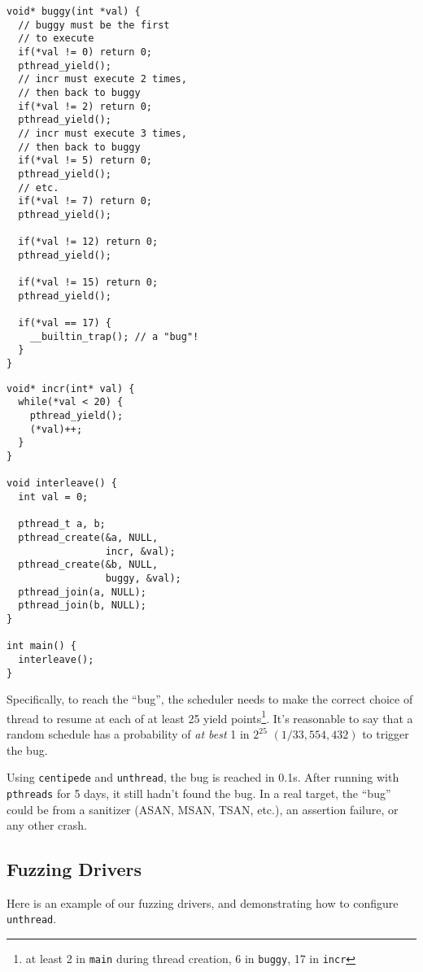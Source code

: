 \documentclass{article}
\begin{document}
\begin{multicols}{2}
\begin{verbatim}
void* buggy(int *val) {
  // buggy must be the first 
  // to execute
  if(*val != 0) return 0; 
  pthread_yield();
  // incr must execute 2 times,
  // then back to buggy
  if(*val != 2) return 0; 
  pthread_yield();
  // incr must execute 3 times, 
  // then back to buggy
  if(*val != 5) return 0;
  pthread_yield();
  // etc.
  if(*val != 7) return 0;
  pthread_yield();

  if(*val != 12) return 0;
  pthread_yield();

  if(*val != 15) return 0;
  pthread_yield();

  if(*val == 17) {
    __builtin_trap(); // a "bug"!
  }
}
\end{verbatim}
\columnbreak
\begin{verbatim}
void* incr(int* val) {
  while(*val < 20) {
    pthread_yield();
    (*val)++;
  }
}

void interleave() {
  int val = 0;
  
  pthread_t a, b;
  pthread_create(&a, NULL, 
                 incr, &val);
  pthread_create(&b, NULL, 
                 buggy, &val);
  pthread_join(a, NULL);
  pthread_join(b, NULL);
}

int main() {
  interleave();
}
\end{verbatim}
\end{multicols}

Specifically, to reach the ``bug'', the scheduler needs to make the correct choice of thread to resume at each of at least 25 yield points\footnote{at least 2 in \texttt{main} during thread creation, 6 in \texttt{buggy}, 17 in \texttt{incr}}. It's reasonable to say that a random schedule has a probability of \textit{at best} 1 in $2^{25}$ $(1/33,554,432)$ to trigger the bug.

Using \texttt{centipede} and \texttt{unthread}, the bug is reached in 0.1s. After running with \texttt{pthreads} for 5 days, it still hadn't found the bug. In a real target, the ``bug'' could be from a sanitizer (ASAN, MSAN, TSAN, etc.), an assertion failure, or any other crash.

\subsection{Fuzzing Drivers} \label{appendix:driver}

Here is an example of our fuzzing drivers, and demonstrating how to configure \texttt{unthread}.
\end{document}
